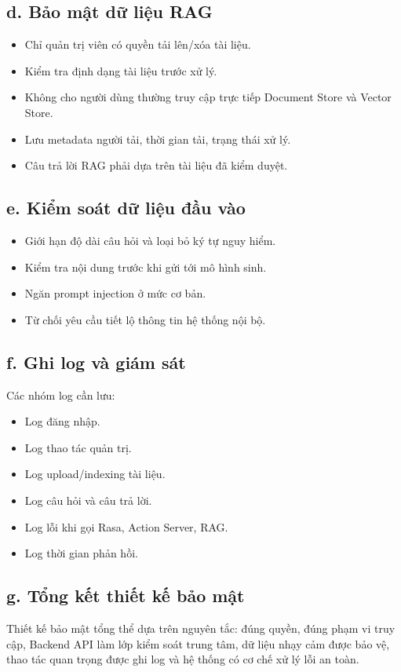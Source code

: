 \subsection*{d. Bảo mật dữ liệu RAG}

\begin{itemize}
    \item Chỉ quản trị viên có quyền tải lên/xóa tài liệu.
    \item Kiểm tra định dạng tài liệu trước xử lý.
    \item Không cho người dùng thường truy cập trực tiếp Document Store và Vector Store.
    \item Lưu metadata người tải, thời gian tải, trạng thái xử lý.
    \item Câu trả lời RAG phải dựa trên tài liệu đã kiểm duyệt.
\end{itemize}

\subsection*{e. Kiểm soát dữ liệu đầu vào}

\begin{itemize}
    \item Giới hạn độ dài câu hỏi và loại bỏ ký tự nguy hiểm.
    \item Kiểm tra nội dung trước khi gửi tới mô hình sinh.
    \item Ngăn prompt injection ở mức cơ bản.
    \item Từ chối yêu cầu tiết lộ thông tin hệ thống nội bộ.
\end{itemize}

\subsection*{f. Ghi log và giám sát}

Các nhóm log cần lưu:
\begin{itemize}
    \item Log đăng nhập.
    \item Log thao tác quản trị.
    \item Log upload/indexing tài liệu.
    \item Log câu hỏi và câu trả lời.
    \item Log lỗi khi gọi Rasa, Action Server, RAG.
    \item Log thời gian phản hồi.
\end{itemize}

\subsection*{g. Tổng kết thiết kế bảo mật}

Thiết kế bảo mật tổng thể dựa trên nguyên tắc: đúng quyền, đúng phạm vi truy cập, Backend API làm lớp kiểm soát trung tâm, dữ liệu nhạy cảm được bảo vệ, thao tác quan trọng được ghi log và hệ thống có cơ chế xử lý lỗi an toàn.
